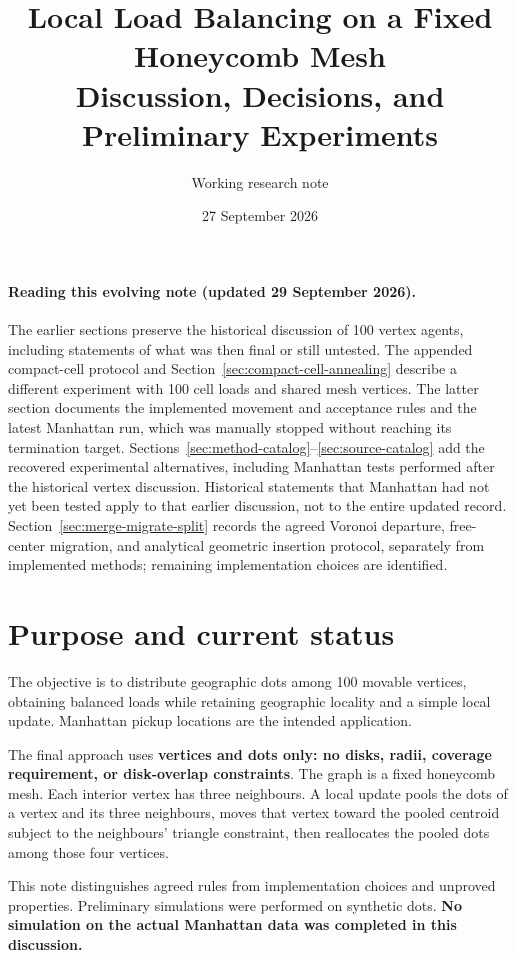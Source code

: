 \documentclass[11pt]{article}
\title{Local Load Balancing on a Fixed Honeycomb Mesh\\Discussion, Decisions, and Preliminary Experiments}
\author{Working research note}
\date{27 September 2026}
\begin{document}
\maketitle

\paragraph{Reading this evolving note (updated 29 September 2026).}
The earlier sections preserve the historical discussion of 100 vertex agents,
including statements of what was then final or still untested. The appended
compact-cell protocol and Section~\ref{sec:compact-cell-annealing} describe a
different experiment with 100 cell loads and shared mesh vertices. The latter
section documents the implemented movement and acceptance rules and the latest
Manhattan run, which was manually stopped without reaching its termination target.
Sections~\ref{sec:method-catalog}--\ref{sec:source-catalog} add the recovered
experimental alternatives, including Manhattan tests performed after the historical
vertex discussion. Historical statements that Manhattan had not yet been tested
apply to that earlier discussion, not to the entire updated record.
Section~\ref{sec:merge-migrate-split} records the agreed Voronoi departure,
free-center migration, and analytical geometric insertion protocol, separately
from implemented methods; remaining implementation choices are identified.

\section{Purpose and current status}
The objective is to distribute geographic dots among 100 movable vertices, obtaining balanced loads while retaining geographic locality and a simple local update. Manhattan pickup locations are the intended application.

The final approach uses \textbf{vertices and dots only: no disks, radii, coverage requirement, or disk-overlap constraints}. The graph is a fixed honeycomb mesh. Each interior vertex has three neighbours. A local update pools the dots of a vertex and its three neighbours, moves that vertex toward the pooled centroid subject to the neighbours' triangle constraint, then reallocates the pooled dots among those four vertices.

This note distinguishes agreed rules from implementation choices and unproved properties. Preliminary simulations were performed on synthetic dots. \textbf{No simulation on the actual Manhattan data was completed in this discussion.}
\end{document}
